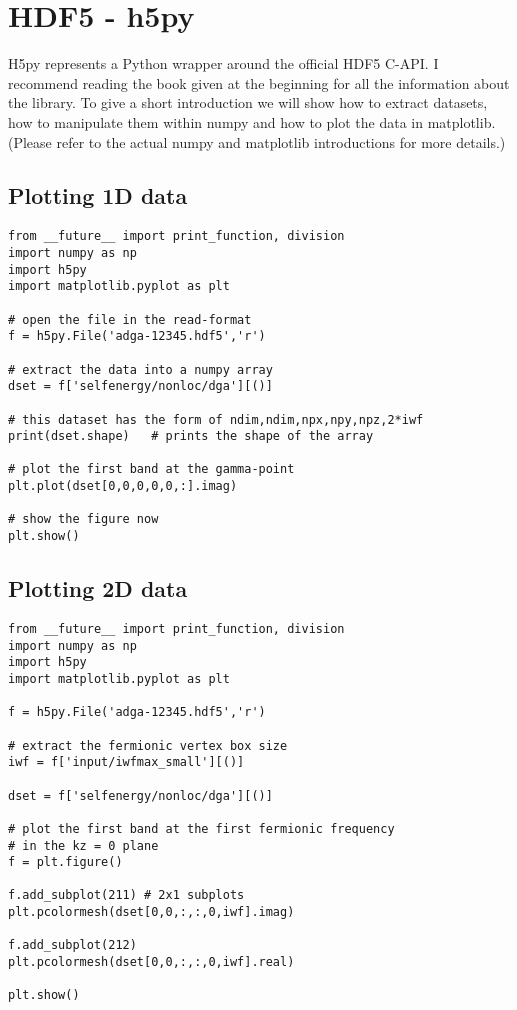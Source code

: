 \documentclass[a4paper,11pt]{article}
\numberwithin{equation}{section} %
\begin{document}
\section{HDF5 - h5py}

H5py represents a Python wrapper around the official HDF5 C-API. I recommend reading the book given at the
beginning for all the information about the library. To give a short introduction
we will show how to extract datasets, how to manipulate them within numpy and how
to plot the data in matplotlib. (Please refer to the actual numpy and matplotlib introductions for more details.)

\subsection*{Plotting 1D data}
\begin{verbatim}
from __future__ import print_function, division
import numpy as np
import h5py
import matplotlib.pyplot as plt

# open the file in the read-format
f = h5py.File('adga-12345.hdf5','r')

# extract the data into a numpy array
dset = f['selfenergy/nonloc/dga'][()]

# this dataset has the form of ndim,ndim,npx,npy,npz,2*iwf
print(dset.shape)	# prints the shape of the array

# plot the first band at the gamma-point
plt.plot(dset[0,0,0,0,0,:].imag)

# show the figure now
plt.show()
\end{verbatim}


\newpage
\subsection*{Plotting 2D data}
\begin{verbatim}
from __future__ import print_function, division
import numpy as np
import h5py
import matplotlib.pyplot as plt

f = h5py.File('adga-12345.hdf5','r')

# extract the fermionic vertex box size
iwf = f['input/iwfmax_small'][()]

dset = f['selfenergy/nonloc/dga'][()]

# plot the first band at the first fermionic frequency
# in the kz = 0 plane
f = plt.figure()

f.add_subplot(211) # 2x1 subplots
plt.pcolormesh(dset[0,0,:,:,0,iwf].imag)

f.add_subplot(212)
plt.pcolormesh(dset[0,0,:,:,0,iwf].real)

plt.show()
\end{verbatim}
\end{document}
